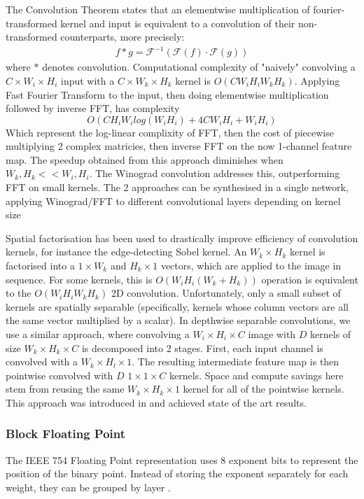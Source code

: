 \documentclass[12pt]{article}
\newcommand{\Fourier}{\mathcal{F}}
\begin{document}
The Convolution Theorem states that an elementwise multiplication of fourier-transformed kernel
and input is equivalent to a convolution of their non-transformed counterparts, more precisely:
\begin{gather}
	f * g = \Fourier^{-1}(\Fourier(f) \cdot \Fourier(g))
\end{gather}
where $*$ denotes convolution.
Computational complexity of "naively" convolving a $C \times W_i \times H_i$ input with a $C
\times W_k \times H_k$ kernel is $O(CW_iH_iW_kH_k)$.
Applying Fast Fourier Transform to the input, then doing elementwise multiplication followed
by inverse FFT, has complexity
$$O(CH_iW_ilog(W_iH_i) + 4CW_iH_i + W_iH_i)$$
Which represent the log-linear complixity of FFT, then the cost of piecewise multiplying 2
complex matricies,
then inverse FFT on the now 1-channel feature map. The speedup obtained from this approach
diminishes when $W_k, H_k << W_i, H_i$\cite{liu2016pruning}.
The Winograd convolution addresses this, outperforming FFT on small kernels.
The 2 approaches can be synthesised in a single network, applying Winograd/FFT to different
convolutional layers depending on kernel size \cite{zhuge2018face}

Spatial factorisation has been used to drastically improve efficiency of convolution kernels,
for instance the edge-detecting Sobel kernel.
An $W_k \times H_k$ kernel is factorised into a $1 \times W_k$ and $H_k \times 1$ vectors,
which are applied to the image in sequence.
For some kernels, this is $O(W_iH_i(W_k + H_k))$ operation is equivalent to the $O(W_iH_iW_kH_k)$
2D convolution.
Unfortunately, only a small subset of kernels are spatially separable (specifically, kernels
whose column vectors are all the same vector multiplied by a scalar).
In depthwise separable convolutions, we use a similar approach, where convolving a $W_i \times
H_i \times C$ image with $D$ kernels of size $W_k \times H_k \times C$ is decomposed into 2 stages.
First, each input channel is convolved with a $W_k \times H_l \times 1$.
The resulting intermediate feature map is then pointwise convolved with $D$ $1 \times 1 \times
C$ kernels.
Space and compute savings here stem from reusing the same $W_k \times H_k \times 1$ kernel for
all of the pointwise kernels.
This approach was introduced in \cite{howard2017mobilenets} and achieved state of the art results.

\subsubsection{Block Floating Point}
The IEEE 754 Floating Point representation uses 8 exponent bits to represent the position of
the binary point.
Instead of storing the exponent separately for each weight, they can be grouped by layer
\cite{courbariaux2014training}.
\end{document}

